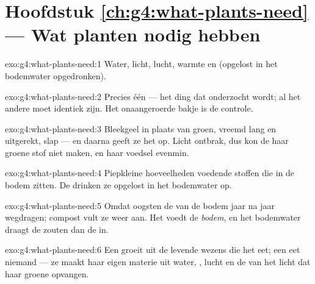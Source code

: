 \section*{Hoofdstuk \ref{ch:g4:what-plants-need} --- Wat planten nodig hebben}

\begin{solution}{exo:g4:what-plants-need:1}
Water, licht, lucht, warmte en  (opgelost in het
bodemwater opgedronken).
\end{solution}

\begin{solution}{exo:g4:what-plants-need:2}
Precies één --- het ding dat onderzocht wordt; al het andere moet
identiek zijn. Het onaangeroerde bakje is de controle.
\end{solution}

\begin{solution}{exo:g4:what-plants-need:3}
Bleekgeel in plaats van groen, vreemd lang en uitgerekt, slap --- en
daarna geeft ze het op. Licht ontbrak, dus kon de  haar groene
stof niet maken, en haar voedsel evenmin.
\end{solution}

\begin{solution}{exo:g4:what-plants-need:4}
Piepkleine hoeveelheden voedende stoffen die in de bodem zitten. De
 drinken ze opgelost in het bodemwater op.
\end{solution}

\begin{solution}{exo:g4:what-plants-need:5}
Omdat oogsten de  van de bodem jaar na jaar wegdragen;
compost vult ze weer aan. Het voedt de \emph{bodem}, en het bodemwater
draagt de zouten dan de  in.
\end{solution}

\begin{solution}{exo:g4:what-plants-need:6}
Een  groeit uit de levende wezens die het eet; een  eet
niemand --- ze maakt haar eigen materie uit water, ,
lucht en de  van het licht dat haar groene  opvangen.
\end{solution}

